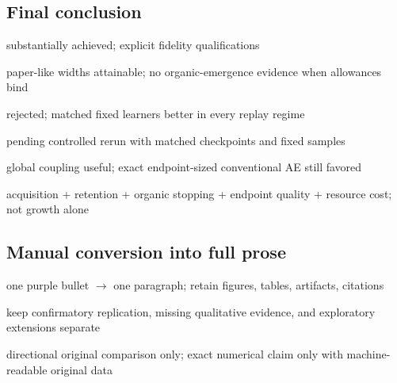 \subsection{Final conclusion}
\begin{draftpoints}
  \item {}substantially achieved; explicit fidelity qualifications
  \item {}paper-like widths attainable; no organic-emergence evidence when allowances bind
  \item {}rejected; matched fixed learners better in every replay regime
  \item {}pending controlled rerun with matched checkpoints and fixed samples
  \item {}global coupling useful; exact endpoint-sized conventional AE still favored
  \item {}acquisition + retention + organic stopping + endpoint quality + resource cost; not growth alone
\end{draftpoints}

\subsection{Manual conversion into full prose}
\begin{draftpoints}
  \item {}one purple bullet $\rightarrow$ one paragraph; retain figures, tables, artifacts, citations
  \item {}keep confirmatory replication, missing qualitative evidence, and exploratory extensions separate
  \item {}directional original comparison only; exact numerical claim only with machine-readable original data
\end{draftpoints}
